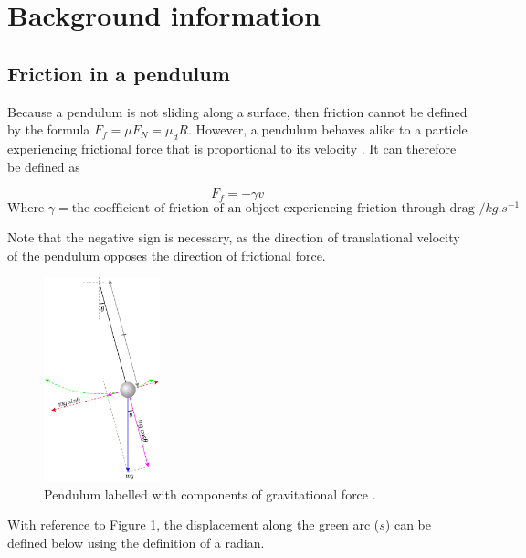 \documentclass[letterpaper, 12pt]{article}
\begin{document}
\section{Background information} \label{sec:bgInfo}

\subsection{Friction in a pendulum}

Because a pendulum is not sliding along a surface,
then friction cannot be defined by the formula
\(F_f = \mu F_N = \mu_d R\). However, a pendulum
behaves alike to a particle experiencing frictional force
that is proportional to its velocity \cite{FrictionalForceProportional2021}.
It can therefore be defined as

\begin{equation} \label{eq:frictionVelocity}
    F_f = -\gamma v
\end{equation}
\[
    \text{Where } \gamma = \text{the coefficient of friction of an object experiencing friction through drag } /\unit{kg.s^{-1}}
\]

Note that the negative sign is necessary, as the direction
of translational velocity of the pendulum
opposes the direction of frictional force.

\begin{figure}[H]
    \centering
    \includegraphics[width=0.3\textwidth]{labelledPendulum.png}
    \caption{Pendulum labelled with components of gravitational force \protect\cite{krishnavedalaEnglishDiagramDepicting2013}.}
    \label{fig:labelledPendulum}
\end{figure}

With reference to Figure \ref*{fig:labelledPendulum}, the
displacement along the green arc (\(s\)) can be defined
below using the definition of a radian.
\end{document}
